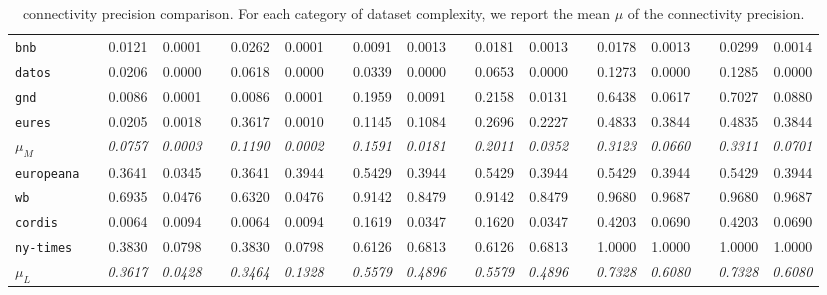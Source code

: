 \begin{table}
{\begin{tabular}{lc@{\hs}rrc@{\hs}rrc@{\hs}rrc@{\hs}rrc@{\hs}rrc@{\hs}rr}
\texttt{bnb} & \phantom{a} & 0.0121 & 0.0001 & \phantom{a} & 0.0262 & 0.0001 & \phantom{a} & 0.0091 & 0.0013  & \phantom{a} & 0.0181 & 0.0013 & \phantom{a} & 0.0178 & 0.0013 & \phantom{a} & 0.0299 & 0.0014 \\
\texttt{datos} & \phantom{a} & 0.0206 & 0.0000 & \phantom{a} & 0.0618 & 0.0000 & \phantom{a} & 0.0339 & 0.0000  & \phantom{a} & 0.0653 & 0.0000 & \phantom{a} & 0.1273 & 0.0000 & \phantom{a} & 0.1285 & 0.0000 \\
\texttt{gnd} & \phantom{a} & 0.0086 & 0.0001 & \phantom{a} & 0.0086 & 0.0001 & \phantom{a} & 0.1959 & 0.0091  & \phantom{a} & 0.2158 & 0.0131 & \phantom{a} & 0.6438 & 0.0617 & \phantom{a} & 0.7027 & 0.0880 \\
\texttt{eures} & \phantom{a} & 0.0205 & 0.0018 & \phantom{a} & 0.3617 & 0.0010 & \phantom{a} & 0.1145 & 0.1084  & \phantom{a} & 0.2696 & 0.2227 & \phantom{a} & 0.4833 & 0.3844 & \phantom{a} & 0.4835 & 0.3844 \\
$\mu_M$ & \phantom{a} & \emph{0.0757} & \emph{0.0003} & \phantom{a} & \emph{0.1190} & \emph{0.0002} & \phantom{a} & \emph{0.1591} & \emph{0.0181} & \phantom{a} & \emph{0.2011} & \emph{0.0352} & \phantom{a} & \emph{0.3123} & \emph{0.0660} & \phantom{a} & \emph{0.3311} & \emph{0.0701} \\
\midrule
\texttt{europeana} & \phantom{a} & 0.3641 & 0.0345 & \phantom{a} & 0.3641 & 0.3944 & \phantom{a} & 0.5429 & 0.3944  & \phantom{a} & 0.5429 & 0.3944 & \phantom{a} & 0.5429 & 0.3944 & \phantom{a} & 0.5429 & 0.3944 \\
\texttt{wb} & \phantom{a} & 0.6935 & 0.0476 & \phantom{a} & 0.6320 & 0.0476 & \phantom{a} & 0.9142 & 0.8479  & \phantom{a} & 0.9142 & 0.8479 & \phantom{a} & 0.9680 & 0.9687 & \phantom{a} & 0.9680 & 0.9687 \\
\texttt{cordis} & \phantom{a} & 0.0064 & 0.0094 & \phantom{a} & 0.0064 & 0.0094 & \phantom{a} & 0.1619 & 0.0347  & \phantom{a} & 0.1620 & 0.0347 & \phantom{a} & 0.4203 & 0.0690 & \phantom{a} & 0.4203 & 0.0690 \\
\texttt{ny-times} & \phantom{a} & 0.3830 & 0.0798 & \phantom{a} & 0.3830 & 0.0798 & \phantom{a} & 0.6126 & 0.6813  & \phantom{a} & 0.6126 & 0.6813 & \phantom{a} & 1.0000 & 1.0000 & \phantom{a} & 1.0000 & 1.0000 \\
$\mu_L$ & \phantom{a} & \emph{0.3617} & \emph{0.0428} & \phantom{a} & \emph{0.3464} & \emph{0.1328} & \phantom{a} & \emph{0.5579} & \emph{0.4896} & \phantom{a} & \emph{0.5579} & \emph{0.4896} & \phantom{a} & \emph{0.7328} & \emph{0.6080} & \phantom{a} & \emph{0.7328} & \emph{0.6080} \\
\bottomrule
\end{tabular}
}
\caption{\gls{connectivity} precision comparison. For each category of dataset complexity, we report the mean $\mu$ of the connectivity precision.}
\label{tab:precision-conn}
\end{table}
